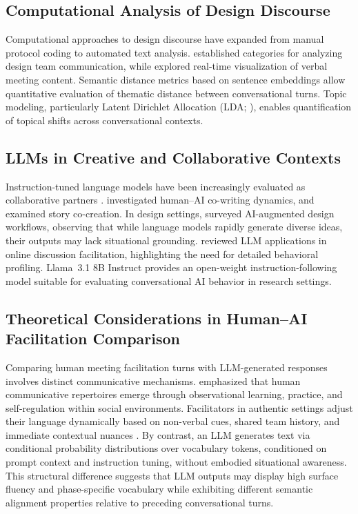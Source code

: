\documentclass[preprint,12pt,authoryear]{elsarticle}
\begin{document}
\subsection{Computational Analysis of Design Discourse}

Computational approaches to design discourse have expanded from manual protocol coding \citep{kan2017} to automated text analysis. \citet{stempfle2002} established categories for analyzing design team communication, while \citet{chandrasegaran2019} explored real-time visualization of verbal meeting content. Semantic distance metrics based on sentence embeddings \citep{reimers2019} allow quantitative evaluation of thematic distance between conversational turns. Topic modeling, particularly Latent Dirichlet Allocation (LDA; \citealt{blei2003lda}), enables quantification of topical shifts across conversational contexts.

\subsection{LLMs in Creative and Collaborative Contexts}

Instruction-tuned language models have been increasingly evaluated as collaborative partners \citep{frich2019}. \citet{lee2022} investigated human--AI co-writing dynamics, and \citet{yuan2022} examined story co-creation. In design settings, \citet{peng2025} surveyed AI-augmented design workflows, observing that while language models rapidly generate diverse ideas, their outputs may lack situational grounding. \citet{korre2025} reviewed LLM applications in online discussion facilitation, highlighting the need for detailed behavioral profiling. Llama~3.1 8B Instruct \citep{dubey2024llama3} provides an open-weight instruction-following model suitable for evaluating conversational AI behavior in research settings.

\subsection{Theoretical Considerations in Human--AI Facilitation Comparison}

Comparing human meeting facilitation turns with LLM-generated responses involves distinct communicative mechanisms. \citet{bandura1986social} emphasized that human communicative repertoires emerge through observational learning, practice, and self-regulation within social environments. Facilitators in authentic settings adjust their language dynamically based on non-verbal cues, shared team history, and immediate contextual nuances \citep{schon1983}. By contrast, an LLM generates text via conditional probability distributions over vocabulary tokens, conditioned on prompt context and instruction tuning, without embodied situational awareness. This structural difference suggests that LLM outputs may display high surface fluency and phase-specific vocabulary while exhibiting different semantic alignment properties relative to preceding conversational turns.
\end{document}

